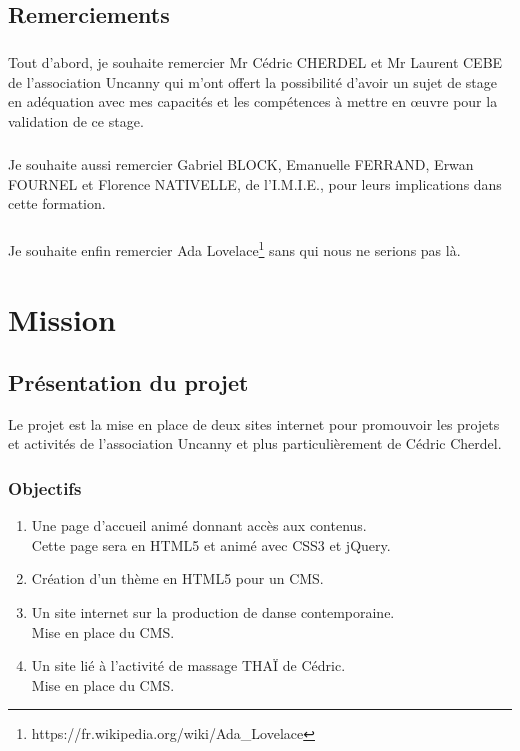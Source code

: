 \documentclass[11pt,a4paper]{report}
\begin{document}
	\section{Remerciements}
		\paragraph*{}Tout d'abord, je souhaite  remercier Mr Cédric CHERDEL et Mr Laurent CEBE de l'association Uncanny qui m'ont offert la possibilité d'avoir un sujet de stage en adéquation avec mes capacités et les compétences à mettre en œuvre pour la validation de ce stage.
		\paragraph*{}Je souhaite aussi remercier Gabriel BLOCK, Emanuelle FERRAND, Erwan FOURNEL et Florence \linebreak NATIVELLE, de l'I.M.I.E., pour leurs implications dans cette formation.
		\paragraph*{}Je souhaite enfin remercier Ada Lovelace\footnote{https://fr.wikipedia.org/wiki/Ada\_Lovelace} sans qui nous ne serions pas là.

\chapter{Mission}
	\section{Présentation du projet}
		Le projet est la mise en place de deux sites internet pour promouvoir les projets et activités de l'association Uncanny et plus particulièrement de Cédric Cherdel. 
		\subsection{Objectifs}
			\begin{enumerate}
				\item Une page d'accueil animé donnant accès aux contenus.\\
				Cette page sera en HTML5 et animé avec CSS3 et jQuery.
				\item Création d'un thème en HTML5 pour un CMS.
				\item Un site internet sur la production de danse contemporaine.\\
				Mise en place du CMS.
				\item Un site lié à l'activité de massage THAÏ de Cédric.\\
				Mise en place du CMS.
			\end{enumerate}
\end{document}
